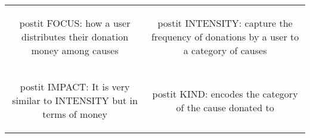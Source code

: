     \begin{tabular}{cc}
        \begin{beamercolorbox}[sep=1em,wd=0.48\textwidth]{postit}
            FOCUS: how a user distributes their donation money among causes
   	    \end{beamercolorbox} &  \begin{beamercolorbox}[sep=1em,wd=0.49\textwidth]{postit}
   	        INTENSITY: capture the frequency of donations by a user to a category of causes
   	    \end{beamercolorbox}\\
        \begin{beamercolorbox}[sep=1em,wd=0.48\textwidth]{postit}
            IMPACT:  It is very similar to INTENSITY but in terms of money
        \end{beamercolorbox} &  \begin{beamercolorbox}[sep=1em,wd=0.49\textwidth]{postit}
            KIND: encodes the category of the cause donated to
        \end{beamercolorbox}
    \end{tabular}
